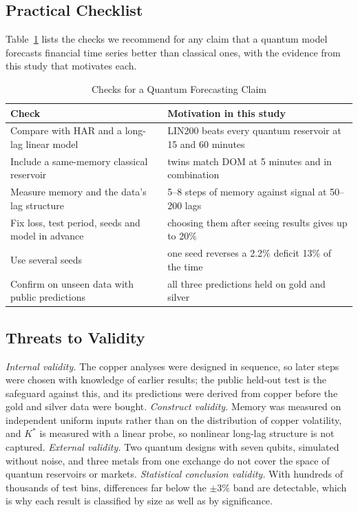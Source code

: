 \documentclass{ieeeaccess}
\begin{document}
\subsection{Practical Checklist}
Table~\ref{tab:checklist} lists the checks we recommend for any claim that a quantum model forecasts financial time series better than classical ones, with the evidence from this study that motivates each.

\begin{table}[t]
\caption{Checks for a Quantum Forecasting Claim}
\label{tab:checklist}
\centering
\begin{tabular}{p{3.2cm}p{4.1cm}}
\hline
Check & Motivation in this study \\
\hline
Compare with HAR and a long-lag linear model & LIN200 beats every quantum reservoir at 15 and 60 minutes \\
Include a same-memory classical reservoir & twins match DOM at 5 minutes and in combination \\
Measure memory and the data's lag structure & 5--8 steps of memory against signal at 50--200 lags \\
Fix loss, test period, seeds and model in advance & choosing them after seeing results gives up to 20\% \\
Use several seeds & one seed reverses a 2.2\% deficit 13\% of the time \\
Confirm on unseen data with public predictions & all three predictions held on gold and silver \\
\hline
\end{tabular}
\end{table}

\subsection{Threats to Validity}
\textit{Internal validity.} The copper analyses were designed in sequence, so later steps were chosen with knowledge of earlier results; the public held-out test is the safeguard against this, and its predictions were derived from copper before the gold and silver data were bought. \textit{Construct validity.} Memory was measured on independent uniform inputs rather than on the distribution of copper volatility, and $K^*$ is measured with a linear probe, so nonlinear long-lag structure is not captured. \textit{External validity.} Two quantum designs with seven qubits, simulated without noise, and three metals from one exchange do not cover the space of quantum reservoirs or markets. \textit{Statistical conclusion validity.} With hundreds of thousands of test bins, differences far below the $\pm3\%$ band are detectable, which is why each result is classified by size as well as by significance.
\end{document}
